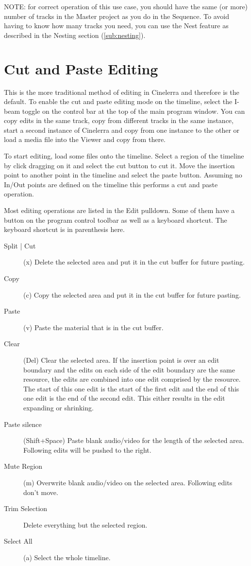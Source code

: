 NOTE: for correct operation of this use case, you should have the same (or more) number of tracks in the Master project as you do in the Sequence.  To avoid having to know how many tracks you need, you can use the Nest feature as described in the Nesting section (\ref{sub:nesting}).

\section{Cut and Paste Editing}%
\label{sec:cut_paste_editing}

This is the more traditional method of editing in Cinelerra and therefore is the default.  To enable the cut and paste editing mode on the timeline, select the I-beam toggle on the control bar at the top of the main program window. You can copy edits in the same track, copy from different tracks in the same instance, start a second instance of Cinelerra and copy from one instance to the other or load a media file into the Viewer and copy from there.

To start editing, load some files onto the timeline.  Select a region of the timeline by click dragging on it and select the cut button to cut it. Move the insertion point to another point in the timeline and select the paste button.  Assuming no In/Out points are defined on the timeline this performs a cut and paste operation.

Most editing operations are listed in the Edit pulldown. Some of them have a button on the program control toolbar as well as a keyboard shortcut.  The keyboard shortcut is in parenthesis here.

\begin{description}
    \item [Split | Cut] (x) Delete the selected area and put it in the cut buffer for future pasting.
    \item[Copy] (c) Copy the selected area and put it in the cut buffer for future pasting.
    \item[Paste] (v)  Paste the material that is in the cut buffer.
    \item[Clear] (Del)  Clear the selected area. If the insertion point is over an edit boundary and the edits on
    each side of the edit boundary are the same resource, the edits are combined into one edit comprised
    by the resource. The start of this one edit is the start of the first edit and the end of this one edit is the
    end of the second edit. This either results in the edit expanding or shrinking.
    \item[Paste silence] (Shift+Space)  Paste blank audio/video for the length of the selected area. Following
    edits will be pushed to the right.
    \item[Mute Region] (m)  Overwrite blank audio/video on the selected area. Following edits don't move.
    \item[Trim Selection] Delete everything but the selected region.
    \item[Select All] (a) Select the whole timeline.
\end{description}

